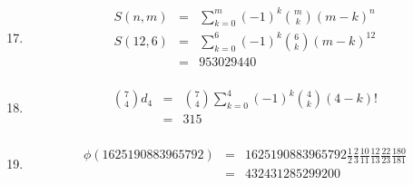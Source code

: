 \documentclass[12pt]{article}
\newcommand{\s}[1]{\setcounter{enumi}{#1}}
\begin{document}
\begin{enumerate}
  \s{16}

  \item
    \begin{eqnarray*}
      S\left(n, m\right)  & = & \sum^m_{k=0} \left(-1\right)^k \binom{m}{k} \left(m - k\right)^n \\
      S\left(12, 6\right) & = & \sum^6_{k=0} \left(-1\right)^k \binom{6}{k} \left(m - k\right)^{12}\\
                          & = & 953029440 \\
    \end{eqnarray*}

  \s{20}

  \item
    \begin{eqnarray*}
      \binom{7}{4} d_4 & = & \binom{7}{4} \sum_{k=0}^4 \left(-1\right)^k \binom{4}{k} \left(4 - k\right)!\\
                       & = & 315 \\
    \end{eqnarray*}

  \s{24}

  \item
    \begin{eqnarray*}
      \phi\left(1625190883965792\right) & = & 1625190883965792 \frac{1}{2} \frac{2}{3} \frac{10}{11} \frac{12}{13} \frac{22}{23} \frac{180}{181} \\
                                        & = & 432431285299200 \\
    \end{eqnarray*}
\end{enumerate}
\end{document}
